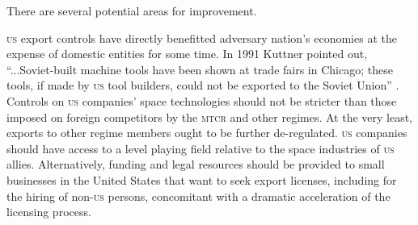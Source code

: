 \documentclass[preprint,twocolumn,5p]{elsarticle}
\begin{document}

There are several potential areas for improvement.

\textsc{us} export controls have directly benefitted adversary nation's economies at the expense of domestic entities for some time. In 1991 Kuttner pointed out, ``...Soviet-built machine tools have been shown at trade fairs in Chicago; these tools, if made by \textsc{us} tool builders, could not be exported to the Soviet Union'' \citep{Kuttner1991}. Controls on \textsc{us} companies' space technologies should not be stricter than those imposed on foreign competitors by the \textsc{mtcr} and other regimes. At the very least, exports to other regime members ought to be further de-regulated. \textsc{us} companies should have access to a level playing field relative to the space industries of \textsc{us} allies. Alternatively, funding and legal resources should be provided to small businesses in the United States that want to seek export licenses, including for the hiring of non-\textsc{us} persons, concomitant with a dramatic acceleration of the licensing process.
\end{document}
